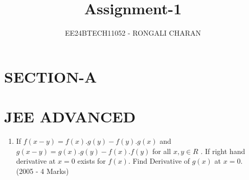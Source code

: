 \documentclass[journal,12pt,twocolumn]{IEEEtran}
\theoremstyle{remark}
\begin{document}

\vspace{3cm}

\title{\textbf{Assignment-1}}
\author{EE24BTECH11052 - RONGALI CHARAN}
\maketitle
\bigskip

\renewcommand{\thefigure}{\theenumi}
\renewcommand{\thetable}{\theenumi}
\onecolumn
\setlength{\columnsep}{2.5em}
\section*{\textbf{SECTION-A}}
\section*{\textbf{JEE ADVANCED}}
\begin{enumerate}
\subsection*{E - Subjective Problems}
    \item If $f(x-y)=f(x).g(y)-f(y).g(x)$ and $ g(x-y)=g(x).g(y)-f(x).f(y) $ for all $x,y \in R $ . If right hand derivative at $x=0$ exists for $f(x)$. Find Derivative of $g(x)$ at $x=0$.
    \hfill(2005 - 4 Marks)
\end{enumerate}
\end{document}
